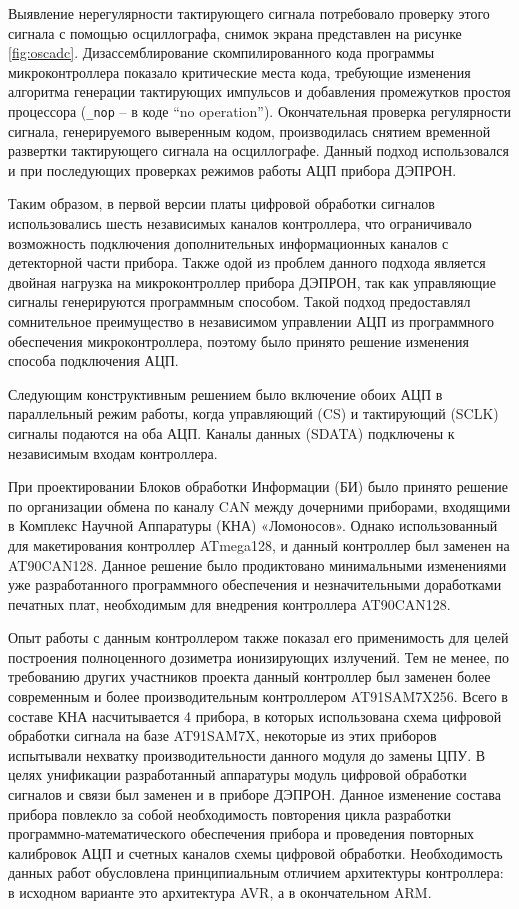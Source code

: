 Выявление нерегулярности тактирующего сигнала потребовало проверку этого сигнала с помощью осциллографа, снимок экрана представлен на рисунке \ref{fig:oscadc}. Дизассемблирование скомпилированного кода программы микроконтроллера показало критические места кода, требующие изменения алгоритма генерации тактирующих импульсов и добавления промежутков простоя процессора (\texttt{\_nop} -- в коде ``no operation''). Окончательная проверка регулярности сигнала, генерируемого выверенным кодом, производилась снятием временной развертки тактирующего сигнала  на осциллографе. Данный подход использовался и при последующих проверках режимов работы АЦП прибора ДЭПРОН.


Таким образом, в первой версии платы цифровой обработки сигналов использовались шесть независимых каналов контроллера, что ограничивало возможность подключения дополнительных информационных каналов с детекторной части прибора. Также одой из проблем данного подхода является двойная нагрузка на микроконтроллер прибора ДЭПРОН, так как управляющие сигналы генерируются программным способом. Такой подход предоставлял сомнительное преимущество в независимом управлении АЦП из программного обеспечения микроконтроллера, поэтому было принято решение изменения способа подключения АЦП.

Следующим конструктивным решением было включение обоих АЦП в параллельный режим работы, когда управляющий (CS) и тактирующий (SCLK) сигналы подаются на оба АЦП. Каналы данных (SDATA) подключены к независимым входам контроллера. 


При проектировании Блоков обработки Информации (БИ) было принято решение по организации обмена по каналу CAN между дочерними приборами, входящими в Комплекс Научной Аппаратуры (КНА) «Ломоносов». Однако использованный для макетирования контроллер ATmega128, и данный контроллер был заменен на AT90CAN128. Данное решение было продиктовано минимальными изменениями уже разработанного программного обеспечения и незначительными доработками печатных плат, необходимым для внедрения контроллера AT90CAN128.

Опыт работы с данным контроллером также показал его применимость для целей построения полноценного дозиметра ионизирующих излучений. Тем не менее, по требованию других участников проекта данный контроллер был заменен более современным и более производительным контроллером AT91SAM7X256. Всего в составе КНА насчитывается 4 прибора, в которых использована схема цифровой обработки сигнала на базе AT91SAM7X, некоторые из этих приборов испытывали нехватку производительности данного модуля до замены ЦПУ. В целях унификации разработанный аппаратуры модуль цифровой обработки сигналов и связи был заменен и в приборе ДЭПРОН. Данное изменение состава прибора повлекло за собой необходимость повторения цикла разработки программно-математического обеспечения прибора и проведения повторных калибровок АЦП и счетных каналов схемы цифровой обработки. Необходимость данных работ обусловлена принципиальным отличием архитектуры контроллера: в исходном варианте это архитектура AVR, а в окончательном ARM. 

